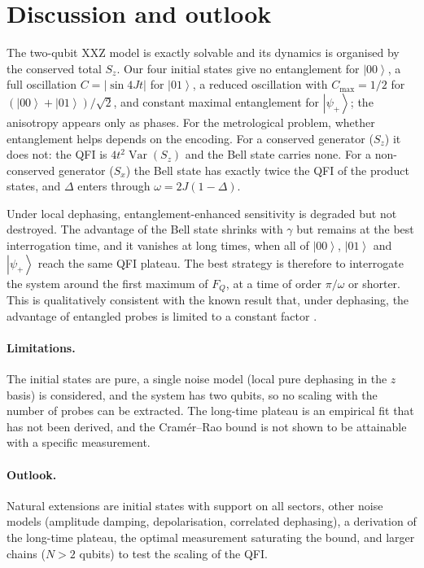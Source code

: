 \documentclass[10.5pt,a4paper]{article}
\newcommand{\ket}[1]{\left|#1\right\rangle}
\newcommand{\Var}{\operatorname{Var}}
\newcommand{\FQ}{F_Q}
\begin{document}
\section{Discussion and outlook}\label{sec:disc}

The two-qubit XXZ model is exactly solvable and its dynamics is organised by the conserved total $S_z$. Our four initial states give no entanglement for $\ket{00}$, a full oscillation $C=\lvert\sin4Jt\rvert$ for $\ket{01}$, a reduced oscillation with $C_{\max}=1/2$ for $(\ket{00}+\ket{01})/\sqrt2$, and constant maximal entanglement for $\ket{\psi_+}$; the anisotropy appears only as phases. For the metrological problem, whether entanglement helps depends on the encoding. For a conserved generator ($S_z$) it does not: the QFI is $4t^2\Var(S_z)$ and the Bell state carries none. For a non-conserved generator ($S_x$) the Bell state has exactly twice the QFI of the product states, and $\Delta$ enters through $\omega=2J(1-\Delta)$.

Under local dephasing, entanglement-enhanced sensitivity is degraded but not destroyed. The advantage of the Bell state shrinks with $\gamma$ but remains at the best interrogation time, and it vanishes at long times, when all of $\ket{00}$, $\ket{01}$ and $\ket{\psi_+}$ reach the same QFI plateau. The best strategy is therefore to interrogate the system around the first maximum of $\FQ$, at a time of order $\pi/\omega$ or shorter. This is qualitatively consistent with the known result that, under dephasing, the advantage of entangled probes is limited to a constant factor \cite{Huelga1997,Escher2011,Demkowicz2012}.

\paragraph{Limitations.}
The initial states are pure, a single noise model (local pure dephasing in the $z$ basis) is considered, and the system has two qubits, so no scaling with the number of probes can be extracted. The long-time plateau is an empirical fit that has not been derived, and the Cram\'er--Rao bound is not shown to be attainable with a specific measurement.

\paragraph{Outlook.}
Natural extensions are initial states with support on all sectors, other noise models (amplitude damping, depolarisation, correlated dephasing), a derivation of the long-time plateau, the optimal measurement saturating the bound, and larger chains ($N>2$ qubits) to test the scaling of the QFI.
\end{document}

